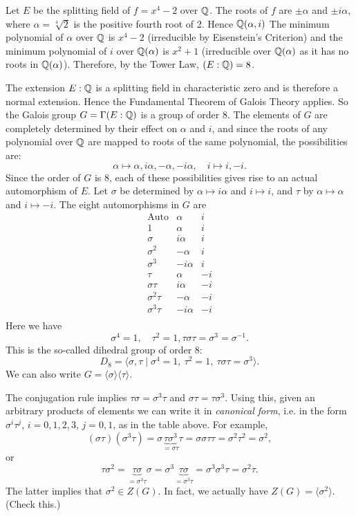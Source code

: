 \begin{example}
	Let $E$ be the splitting field of $f = x^4 - 2$ over $\mathbb{Q}$. The roots of $f$ are $\pm \alpha$ and $\pm i \alpha$, where $\alpha = \sqrt[4]{2}$ is the positive fourth root of 2. Hence $\mathbb{Q}(\alpha, i)$ The minimum polynomial of $\alpha$ over $\mathbb{Q}$ is $x^4 - 2$ (irreducible by Eisenstein's Criterion) and the minimum polynomial of $i$ over $\mathbb{Q}(\alpha)$ is $x^2 + 1$ (irreducible over $\mathbb{Q}(\alpha)$ as it has no roots in $\mathbb{Q}(\alpha)$). Therefore, by the Tower Law, $(E : \mathbb{Q}) = 8$.
	
	The extension $E : \mathbb{Q}$ is a splitting field in characteristic zero and is therefore a normal extension. Hence the Fundamental Theorem of Galois Theory applies. So the Galois group $G = \Gamma(E : \mathbb{Q})$ is a group of order 8. The elements of $G$ are completely determined by their effect on $\alpha$ and $i$, and since the roots of any polynomial over $\mathbb{Q}$ are mapped to roots of the same polynomial, the possibilities are:
	\[
		\alpha \mapsto \alpha, i \alpha, -\alpha, -i \alpha, \quad i \mapsto i, -i.
	\]
	Since the order of $G$ is 8, each of these possibilities gives rise to an actual automorphism of $E$. Let $\sigma$ be determined by $\alpha \mapsto i \alpha$ and $i \mapsto i$, and $\tau$ by $\alpha \mapsto \alpha$ and $i \mapsto -i$. The eight automorphisms in $G$ are
	\[
		\begin{array}{c|c|c}
			\text{Auto} & \alpha & i \\
			\hline
			1 & \alpha & i \\
			\sigma & i \alpha & i \\
			\sigma^2 & -\alpha & i \\
			\sigma^3 & -i \alpha & i \\
			\tau & \alpha & -i \\
			\sigma \tau & i \alpha & -i \\
			\sigma^2 \tau & -\alpha & -i \\
			\sigma^3 \tau & -i \alpha & -i \\
		\end{array}
	\]
	Here we have
	\[
		\sigma^4 = 1, \quad \tau^2 = 1, \tau \sigma \tau = \sigma^3 = \sigma^{-1}.
	\]
	This is the so-called dihedral group of order 8:
	\[
		D_8 = \langle \sigma, \tau \mid \sigma^4 = 1,\ \tau^2 = 1,\ \tau \sigma \tau = \sigma^3 \rangle.
	\]
	We can also write $G = \langle \sigma \rangle \langle \tau \rangle$.
	
	The conjugation rule implies $\tau \sigma = \sigma^3 \tau$ and $\sigma \tau = \tau \sigma^3$. Using this, given an arbitrary products of elements we can write it in \emph{canonical form}, i.e. in the form $\sigma^i \tau^j$, $i = 0, 1, 2, 3$, $j = 0, 1$, as in the table above. For example,
	\[
		(\sigma\tau)(\sigma^3 \tau) = \sigma \underbrace{\tau\sigma^3}_{= \sigma\tau} \tau = \sigma\sigma\tau\tau = \sigma^2 \tau^2 = \sigma^2,
	\]
	or
	\[
		\tau\sigma^2 = \underbrace{\tau\sigma}_{= \sigma^3 \tau} \sigma = \sigma^3 \underbrace{\tau\sigma}_{= \sigma^3 \tau} = \sigma^3 \sigma^3 \tau = \sigma^2 \tau.
	\]
	The latter implies that $\sigma^2 \in Z(G)$. In fact, we actually have $Z(G) = \langle \sigma^2 \rangle$. (Check this.)
	

\end{example}
